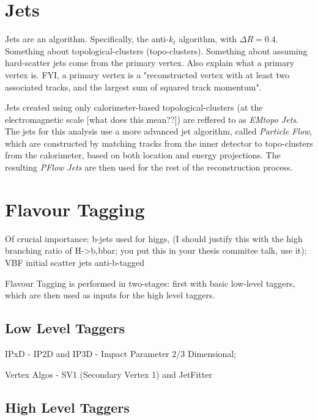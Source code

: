     \section{Jets}
        Jets are an algorithm.
        Specifically, the anti-$k_t$ algorithm, with $\Delta R = 0.4$.
        Something about topological-clusters (topo-clusters).
        \cite{anti_kt}
        Something about assuming hard-scatter jets come from the primary vertex.
        Also explain what a primary vertex is.
        FYI, a primary vertex is a "reconstructed vertex with at least two associated tracks, and the largest sum of squared track momentum".

        Jets created using only calorimeter-based topological-clusters (at the electromagnetic scale [what does this mean??]) %
            are reffered to as \textit{EMtopo Jets}.
        The jets for this analysis use a more advanced jet algorithm, called \textit{Particle Flow},
            which are constructed by matching tracks from the inner detector to topo-clusters from the calorimeter,
            based on both location and energy projections.
        The resulting \textit{PFlow Jets} are then used for the rest of the reconstruction process.
        \cite{pflow}
        \cite{jet_energy_scale13TeV}

    \section{Flavour Tagging}
        Of crucial importance:
            b-jets used for higgs,
                (I should justify this with the high branching ratio of H->b,bbar;
                you put this in your thesis commitee talk, use it);
            VBF initial scatter jets anti-b-tagged

        Flavour Tagging is performed in two-stages:
            first with basic low-level taggers,
            which are then used as inputs for the high level taggers.

        \subsection{Low Level Taggers}

            IPxD - IP2D and IP3D - Impact Parameter 2/3 Dimensional; 

            Vertex Algos - SV1 (Secondary Vertex 1) and JetFitter
            \cite{thesis_giacinto}

        \subsection{High Level Taggers}

